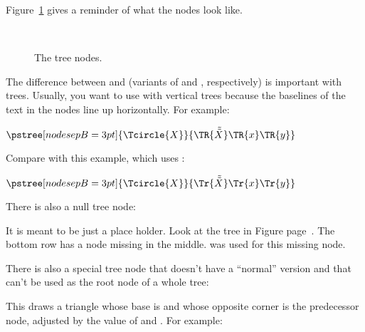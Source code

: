 \documentclass[fontsize=11pt,english,BCOR=10mm,DIV=12,bibliography=totoc,parskip=false,
   headings=small, headinclude=false,footinclude=false,oneside]{pst-doc}
\begin{document}
Figure~\ref{allnodes} gives a reminder of what the nodes look like.

\begin{figure}[!htb]
\begin{LTXexample}
  \small
  \def\s#1{#1~{\ttfamily\string#1}}\def\b#1{#1{\ttfamily\string#1}}\def\psedge#1#2{\ncangle{#2}{#1}}
    \s\Tp{}~{\ttfamily\string\Tc} \s\TC
    \psTree[levelsep=4cm,armB=2cm]{\Tp[edge=\ncline]}
      \b\Tcircle \s\Tdot
      \TCircle[radius=1.2]{\ttfamily\string\TCircle}
      \Tn \b\Toval \b\Ttri \b\Tdia
    \endpsTree
    \s\Tf \b\Tr \b\TR
  \endpsTree
\end{LTXexample}
\caption{The tree nodes.}\label{allnodes}
\end{figure}

The difference between  and  (variants of  and ,
respectively) is important with trees. Usually, you want to use  with
vertical trees because the baselines of the text in the nodes line up
horizontally. For example:
\begin{LTXexample}[pos=l]
   $
   \pstree[nodesepB=3pt]{\Tcircle{X}}{%
     \TR{\tilde{\tilde{X}}}
     \TR{x}
     \TR{y}}
   $
\end{LTXexample}
Compare with this example, which uses :
\begin{LTXexample}[pos=l]
   $
   \pstree[nodesepB=3pt]{\Tcircle{X}}{%
     \Tr{\tilde{\tilde{X}}}
     \Tr{x}
     \Tr{y}}
   $
\end{LTXexample}

There is also a null tree node: 
\begin{BDef}
\end{BDef}
It is meant to be just a place holder. Look at the tree in Figure
page~\pageref{allnodes}. The bottom row has a node missing in the middle.
\Largb{} was used for this missing node. 

There is also a special tree node that doesn't have a ``normal'' version and
that can't be used as the root node of a whole tree:
\begin{BDef}
\OptArgs 
\end{BDef}
This draws a triangle whose base is  %
and whose opposite corner is the predecessor node, adjusted by the value of
 and .
For example:
\begin{LTXexample}[pos=l]
\end{LTXexample}
\end{document}
